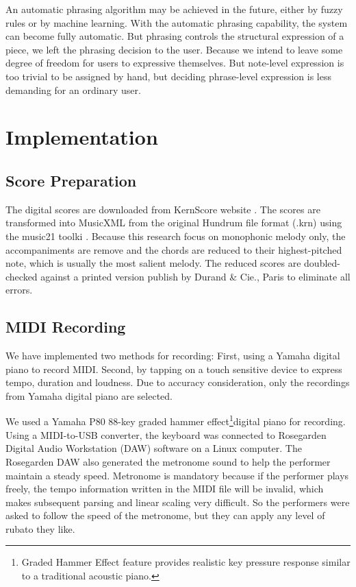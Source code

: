    An automatic phrasing algorithm may be achieved in the future, either by fuzzy rules or by machine learning. With the automatic phrasing capability, the system can become fully automatic. But phrasing controls the structural expression of a piece, we left the phrasing decision to the user. Because we intend to leave some degree of freedom for users to expressive themselves. But note-level expression is too trivial to be assigned by hand, but deciding phrase-level expression is less demanding for an ordinary user. 

 
\section{Implementation}

\subsection{Score Preparation}

The digital scores are downloaded from KernScore website \cite{KernScores}. The  scores are transformed into MusicXML from the original Hundrum file format (.krn) using the  music21 toolki \cite{music21}. Because this research focus on monophonic melody only, the accompaniments are remove and the chords are reduced to their highest-pitched note, which is usually the most salient melody. The reduced scores are doubled-checked against a printed version publish by Durand \& Cie., Paris \cite{Clementi1915} to eliminate all errors. %

\subsection{MIDI Recording}
We have implemented two methods for recording: First, using a Yamaha digital piano to record MIDI. Second, by tapping on a touch sensitive device to express tempo, duration and loudness. Due to accuracy consideration, only the recordings from Yamaha digital piano are selected.


We used a Yamaha P80 88-key graded hammer effect\footnote{Graded Hammer Effect feature provides realistic key pressure response similar to a traditional acoustic piano.}digital piano for recording. Using a MIDI-to-USB converter, the keyboard was connected to Rosegarden Digital Audio Workstation (DAW) software on a Linux computer. The Rosegarden DAW also generated the metronome sound to help the performer maintain a steady speed. Metronome is mandatory because if the performer plays freely, the tempo information written in the MIDI file will be invalid, which makes subsequent parsing and linear scaling very difficult. So the performers were asked to follow the speed of the metronome, but they can apply any level of rubato they like. 

